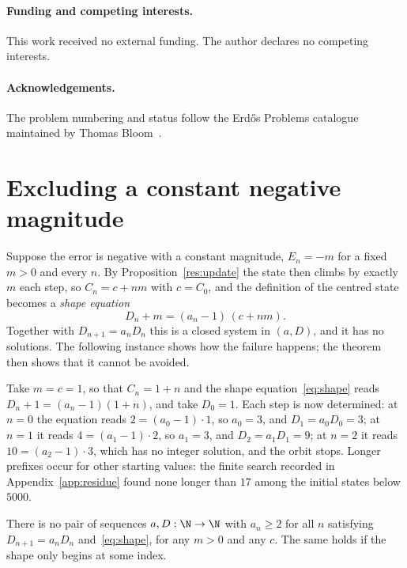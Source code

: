 \documentclass[11pt]{article}
\begin{document}
\paragraph{Funding and competing interests.} This work received no external
funding.  The author declares no competing interests.

\paragraph{Acknowledgements.} The problem numbering and status follow the
Erd\H{o}s Problems catalogue maintained by Thomas Bloom~\cite{erdosproblems}.

\appendix
\section{Excluding a constant negative magnitude}\label{sec:constant}

Suppose the error is negative with a constant magnitude, $E_n=-m$ for a fixed
$m>0$ and every $n$.  By
Proposition~\ref{res:update} the state then climbs by exactly $m$ each step,
so $C_n=c+nm$ with $c=C_0$, and the definition of the centred state becomes a
\emph{shape equation}
\[
 D_n+m=(a_n-1)\,(c+nm) .
\tag{5.1}\label{eq:shape}
\]
Together with $D_{n+1}=a_nD_n$ this is a closed system in $(a,D)$, and it has
no solutions.  The following instance shows how the failure happens; the
theorem then shows that it cannot be avoided.

\begin{example}\label{ex:shape}
Take $m=c=1$, so that $C_n=1+n$ and the shape equation~\eqref{eq:shape} reads
$D_n+1=(a_n-1)(1+n)$, and take $D_0=1$.  Each step is now determined: at $n=0$
the equation reads $2=(a_0-1)\cdot1$, so $a_0=3$, and $D_1=a_0D_0=3$; at $n=1$
it reads $4=(a_1-1)\cdot2$, so $a_1=3$, and $D_2=a_1D_1=9$; at $n=2$ it reads
$10=(a_2-1)\cdot3$, which has no integer solution, and the orbit stops.
Longer prefixes occur for other starting values: the finite search recorded in
Appendix~\ref{app:residue} found none longer than $17$ among the initial
states below $5000$.
\end{example}

\begin{theorem}\label{res:constant}
There is no pair of sequences $a,D:\N\to\N$ with $a_n\ge2$ for all $n$
satisfying $D_{n+1}=a_nD_n$ and~\eqref{eq:shape}, for any $m>0$ and any
$c$.  The same holds if the shape only begins at some index.
\end{theorem}
\end{document}
